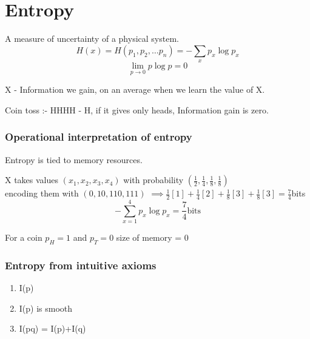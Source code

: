 \chapter{Entropy}
\begin{definition}[Entropy]
	A measure of uncertainty of a physical system.
	\[
		H(x) = H(p_1,p_2,\ldots p_n ) = -\sum_x p_x \log p_x
	\]
	\[
		\lim\limits_{p \to 0} p\log p = 0
	\]
\end{definition}
X - Information we gain, on an average when we learn the value of X.
\begin{eg}
	Coin toss :- HHHH - H, if it gives only heads, Information gain is zero.
\end{eg}
\subsection*{Operational interpretation of entropy}
Entropy is tied to memory resources. 
\begin{eg}
	X  takes values \((x_1, x_2 , x_3, x_4)\) with probability \((\frac{1}{2},\frac{1}{4},\frac{1}{8},\frac{1}{8})\)\\ encoding them with \((0,10,110,111)\) \(\implies \frac{1}{2}[1]+\frac{1}{4}[2]+\frac{1}{8}[3]+\frac{1}{8}[3] = \frac{7}{4}\)bits
	\[
		-\sum\limits_{x=1}^{4} p_x \log p_x = \frac{7}{4} \text{bits}
	\]
\end{eg}
\begin{eg}
	For a coin \(p_H = 1\) and \(p_T = 0\) size of memory = 0
\end{eg}
\subsection*{Entropy from intuitive axioms}
\begin{enumerate}
	\item I(p)
	\item I(p) is smooth
	\item I(pq) = I(p)+I(q)
\end{enumerate}